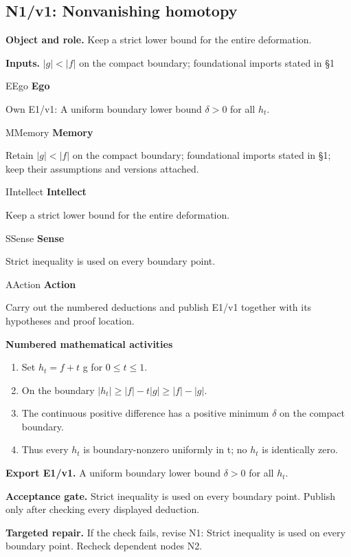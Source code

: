\documentclass[preprint,12pt,aps,pra,showkeys,amsmath,amssymb,superscriptaddress,floatfix]{revtex4-2}
\theoremstyle{definition}
\theoremstyle{remark}
\newcommand{\mmfaculty}[3]{%
 \begin{mmfacultybox}{#1}{#2}
 {\sffamily\bfseries\color{MMBlue}#2}\par\smallskip #3
 \end{mmfacultybox}}
\newcommand{\field}[2]{\par\smallskip\noindent\textbf{#1.} #2\par}
\begin{document}
\subsection{N1/v1: Nonvanishing homotopy}

\field{Object and role}{Keep a strict lower bound for the entire deformation.}

\field{Inputs}{\(|g|<|f|\) on the compact boundary; foundational imports stated in §1}

\mmfaculty{E}{Ego}{Own E1/v1: A uniform boundary lower bound \(\delta >0\) for all \(h_t\).}

\mmfaculty{M}{Memory}{Retain \(|g|<|f|\) on the compact boundary; foundational imports stated
in §1; keep their assumptions and versions attached.}

\mmfaculty{I}{Intellect}{Keep a strict lower bound for the entire deformation.}

\mmfaculty{S}{Sense}{Strict inequality is used on every boundary point.}

\mmfaculty{A}{Action}{Carry out the numbered deductions and publish E1/v1 together with its
hypotheses and proof location.}

\smallskip\noindent\textbf{Numbered mathematical activities}

\begin{enumerate}[label=N1.\arabic*,leftmargin=3.4em]

\item Set \(h_t=f+t\) g for \(0\le t\le 1\).

\item On the boundary \(|h_t|\ge |f|-t|g|\ge |f|-|g|\).

\item The continuous positive difference has a positive minimum \(\delta\) on
the compact boundary.

\item Thus every \(h_t\) is boundary-nonzero uniformly in t; no \(h_t\) is
identically zero.

\end{enumerate}

\field{Export E1/v1}{A uniform boundary lower bound \(\delta >0\) for all \(h_t\).}

\field{Acceptance gate}{Strict inequality is used on every boundary point. Publish only after
checking every displayed deduction.}

\field{Targeted repair}{If the check fails, revise N1: Strict inequality is used on every
boundary point. Recheck dependent nodes N2.}
\end{document}

